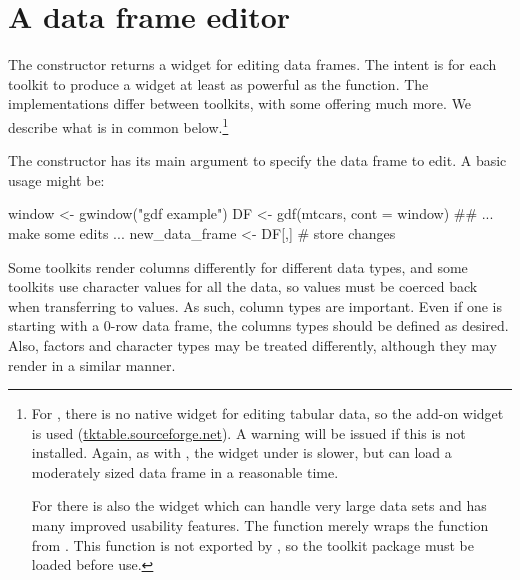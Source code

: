 

\section{A data frame editor}
\label{sec:gWidgets-an-editor-tabular}

The  constructor returns a widget for editing data
frames. The intent is for each toolkit to produce a widget at least as
powerful as the  function. The implementations
differ between toolkits, with some offering much more. We describe
what is in common below.\footnote{ For , there is
  no native widget for editing tabular data, so the 
  add-on widget is used (\url{tktable.sourceforge.net}). A warning
  will be issued if this is not installed. Again, as with
  , the widget under  is slower,
  but can load a moderately sized data frame in a reasonable time. 
  
  For  there is also the 
  widget which can handle very large data sets and has many improved
  usability features. The  function merely wraps the
   function from . This function
  is not exported by , so the toolkit package must be
  loaded before use. }


The constructor has its main argument  to specify the data
frame to edit. A basic usage might be:

\begin{Schunk}
\begin{Sinput}
 window <- gwindow("gdf example")
 DF <- gdf(mtcars, cont = window)
 ## ... make some edits ...
 new_data_frame <- DF[,]                   # store changes
\end{Sinput}
\end{Schunk}
%

Some toolkits render columns differently for different data types, and
some toolkits use character values for all the data, so values must be
coerced back when transferring to \R\/ values. As such, column types
are important. Even if one is starting with a $0$-row data frame, the
columns types should be defined as desired. Also, factors and
character types may be treated differently, although they may render
in a similar manner.

